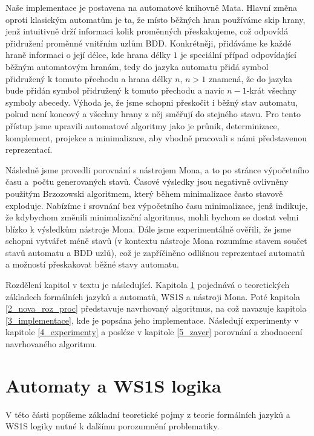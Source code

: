 Naše implementace je postavena na automatové knihovně Mata. Hlavní změna oproti klasickým automatům je ta, že místo běžných hran používáme skip hrany, jenž intuitivně drží informaci kolik proměnných přeskakujeme, což odpovídá přidružení proměnné vnitřním uzlům BDD. Konkrétněji, přidáváme ke každé hraně informaci o její délce, kde hrana délky $1$ je speciální případ odpovídající běžným automatovým hranám, tedy do jazyka automatu přidá symbol přidružený k tomuto přechodu a hrana délky $n$, $n>1$ znamená, že do jazyka bude přidán symbol přidružený k tomuto přechodu a navíc $n-1$-krát všechny symboly abecedy. Výhoda je, že jsme schopni přeskočit i běžný stav automatu, pokud není koncový a všechny hrany z něj směřují do stejného stavu. Pro tento přístup jsme upravili automatové algoritmy jako je průnik, determinizace, komplement, projekce a minimalizace, aby vhodně pracovali s námi představenou reprezentací. 

Následně jsme provedli porovnání s nástrojem Mona, a to po stránce výpočetního času a~počtu generovaných stavů. Časové výsledky jsou negativně ovlivněny použitým Brzozowski algoritmem, který během minimalizace často stavově exploduje. Nabízíme i srovnání bez výpočetního času minimalizace, jenž indikuje, že kdybychom změnili minimalizační algoritmus, mohli bychom se dostat velmi blízko k výsledkům nástroje Mona. Dále jsme experimentálně ověřili, že jsme schopni vytvářet méně stavů (v kontextu nástroje Mona rozumíme stavem součet stavů automatu a BDD uzlů), což je zapříčiněno odlišnou reprezentací automatů a možností přeskakovat běžné stavy automatu. 

Rozdělení kapitol v textu je následující. Kapitola \ref{1_aut_a_log} pojednává o teoretických základech formálních jazyků a automatů, WS1S a nástroji Mona. Poté kapitola \ref{2_nova_roz_proc} představuje navrhovaný algoritmus, na což navazuje kapitola \ref{3_implementace}, kde je popsána jeho implementace. Následují experimenty v kapitole \ref{4_experimenty} a posléze v kapitole \ref{5_zaver} porovnání a zhodnocení navrhovaného algoritmu. 


\chapter{Automaty a WS1S logika}
\label{1_aut_a_log}

V této části popíšeme základní teoretické pojmy z teorie formálních jazyků a WS1S logiky nutné k dalšímu porozumnění problematiky.

